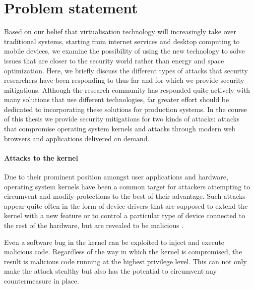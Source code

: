 

\section{Problem statement}\label{intro:problem}
Based on our belief that virtualisation technology will increasingly take over traditional systems, starting from internet services and desktop computing to mobile devices, we examine the possibility of using the new technology to solve issues that are closer to the security world rather than energy and space optimization.
Here, we briefly discuss the different types of attacks that security researchers have been responding to thus far and for which we provide security mitigations. Although the research community has responded quite actively with many solutions that use different technologies, far greater effort should be dedicated to incorporating these solutions for production systems.
In the course of this thesis we provide security mitigations for two kinds of attacks: attacks that compromise operating system kernels and attacks through modern web browsers and applications delivered on demand.  


\paragraph{Attacks to the kernel}
Due to their prominent position amongst user applications and hardware, operating system kernels have been a common target for attackers attempting to circumvent and modify protections to the best of their advantage. Such attacks appear quite often in the form of device drivers that are supposed to extend the kernel with a new feature or to control a particular type of device connected to the rest of the hardware, but are revealed to be malicious \cite{Blunden:2009:RAE:1572523, Butt_protectingcommodity, Boyd-Wickizer:2010:TMD:1855840.1855849, DBLP:conf/sp/NavarroNO12}.

Even a software bug in the kernel can be exploited to inject and execute malicious code. Regardless of the way in which the kernel is compromised, the result is malicious code running at the highest privilege level. This can not only make the attack stealthy but also has the potential to circumvent any countermeasure in place.


